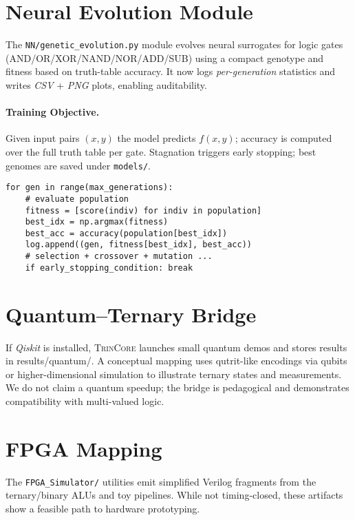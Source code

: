 \documentclass[11pt,a4paper]{article}
\newcommand{\project}{\textsc{TrinCore}}
\newcommand{\code}[1]{\texttt{#1}}
\newcommand{\resquant}{results/quantum}
\begin{document}
\section{Neural Evolution Module}
\label{sec:nn}
The \code{NN/genetic\_evolution.py} module evolves neural surrogates for logic
gates (\textsc{AND/OR/XOR/NAND/NOR/ADD/SUB}) using a compact genotype and
fitness based on truth-table accuracy. It now logs \emph{per-generation}
statistics and writes \emph{CSV} + \emph{PNG} plots, enabling auditability.

\paragraph{Training Objective.}
Given input pairs \((x,y)\) the model predicts \(f(x,y)\); accuracy is computed
over the full truth table per gate. Stagnation triggers early stopping; best
genomes are saved under \code{models/}.

\begin{lstlisting}[caption={Minimal evolution loop (excerpt).}]
for gen in range(max_generations):
    # evaluate population
    fitness = [score(indiv) for indiv in population]
    best_idx = np.argmax(fitness)
    best_acc = accuracy(population[best_idx])
    log.append((gen, fitness[best_idx], best_acc))
    # selection + crossover + mutation ...
    if early_stopping_condition: break
\end{lstlisting}

\section{Quantum--Ternary Bridge}
\label{sec:quantum}
If \emph{Qiskit} is installed, \project{} launches small quantum demos and
stores results in \resquant/. A conceptual mapping uses qutrit-like encodings
via qubits or higher-dimensional simulation to illustrate ternary states and
measurements. We do not claim a quantum speedup; the bridge is pedagogical
and demonstrates compatibility with multi-valued logic.

\section{FPGA Mapping}
\label{sec:fpga}
The \code{FPGA\_Simulator/} utilities emit simplified Verilog fragments from
the ternary/binary ALUs and toy pipelines. While not timing-closed, these
artifacts show a feasible path to hardware prototyping.
\end{document}
